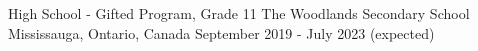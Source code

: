 

\begin{cventries}

  \cventry
    {High School - Gifted Program, Grade 11} %
    {The Woodlands Secondary School} %
    {Mississauga, Ontario, Canada} %
    {September 2019 - July 2023 (expected)} %

\end{cventries}
